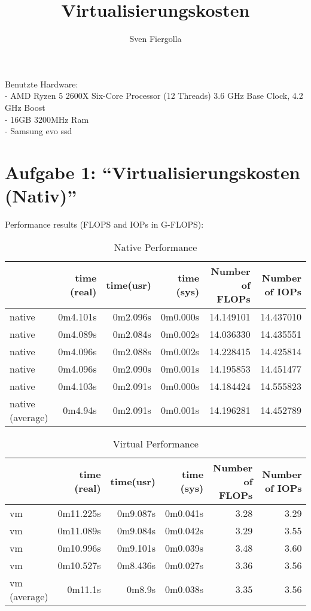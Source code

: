 \documentclass[14]{article}
\title{Virtualisierungskosten}
\author{Sven Fiergolla}
\begin{document}
\maketitle

\par{
Benutzte Hardware:\\
- AMD Ryzen 5 2600X Six-Core Processor (12 Threads) 3.6 GHz Base Clock, 4.2 GHz Boost\\
- 16GB 3200MHz Ram\\ 
- Samsung evo ssd\\
}

\section{Aufgabe 1: “Virtualisierungskosten (Nativ)”}
\par{
Performance results (FLOPS and IOPs in G-FLOPS): 

\begin{table}[h]
	\centering
	\begin{tabular}{l|r|r|r||r|r}	
		 & time (real) & time(usr) & time (sys) & Number of FLOPs & Number of IOPs\\
		\hline
		native & 0m4.101s & 0m2.096s & 0m0.000s & 14.149101 & 14.437010\\
		native & 0m4.089s & 0m2.084s & 0m0.002s & 14.036330 & 14.435551\\
		native & 0m4.096s & 0m2.088s & 0m0.002s & 14.228415 & 14.425814\\
		native & 0m4.096s & 0m2.090s & 0m0.001s & 14.195853 & 14.451477\\
		native & 0m4.103s & 0m2.091s & 0m0.000s & 14.184424 & 14.555823\\
		\hline
		native (average) & 0m4.94s & 0m2.091s & 0m0.001s & 14.196281 & 14.452789 \\
	\end{tabular}
	\caption{Native Performance}
	\label{tab:t1:Native Performance}
\end{table}

\begin{table}[h]
	\centering
	\begin{tabular}{l|r|r|r||r|r}	
		& time (real) & time(usr) & time (sys) & Number of FLOPs & Number of IOPs\\
		\hline
		vm & 0m11.225s & 0m9.087s & 0m0.041s & 3.28 & 3.29\\
		vm & 0m11.089s & 0m9.084s & 0m0.042s & 3.29 & 3.55\\
		vm & 0m10.996s & 0m9.101s & 0m0.039s & 3.48 & 3.60\\
		vm & 0m10.527s & 0m8.436s & 0m0.027s & 3.36 & 3.56\\
		\hline
		vm (average) & 0m11.1s & 0m8.9s & 0m0.038s & 3.35 & 3.56 \\
	\end{tabular}
	\caption{Virtual Performance}
	\label{tab:t2:Virtual Performance}
\end{table}

}
\end{document}
